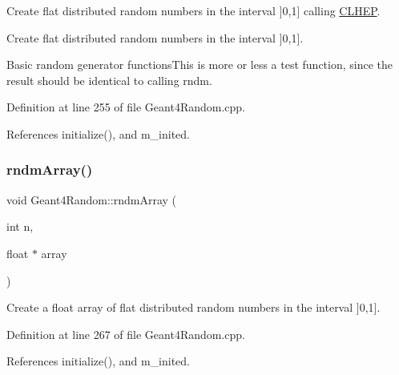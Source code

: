 Create flat distributed random numbers in the interval \mbox{]}0,1\mbox{]} calling \hyperlink{namespace_c_l_h_e_p}{C\+L\+H\+EP}. 

Create flat distributed random numbers in the interval \mbox{]}0,1\mbox{]}.

Basic random generator functions\+This is more or less a test function, since the result should be identical to calling rndm. 

Definition at line 255 of file Geant4\+Random.\+cpp.



References initialize(), and m\+\_\+inited.

\hypertarget{class_d_d4hep_1_1_simulation_1_1_geant4_random_aaf9f4a7acf4d65ce0b3f6b19486d473d}{}\label{class_d_d4hep_1_1_simulation_1_1_geant4_random_aaf9f4a7acf4d65ce0b3f6b19486d473d} 
\subsubsection{\texorpdfstring{rndm\+Array()}{rndmArray()}\hspace{0.1cm}{\footnotesize\ttfamily [1/2]}}
{\footnotesize\ttfamily void Geant4\+Random\+::rndm\+Array (\begin{DoxyParamCaption}\item[{int}]{n,  }\item[{float $\ast$}]{array }\end{DoxyParamCaption})}



Create a float array of flat distributed random numbers in the interval \mbox{]}0,1\mbox{]}. 



Definition at line 267 of file Geant4\+Random.\+cpp.



References initialize(), and m\+\_\+inited.

\hypertarget{class_d_d4hep_1_1_simulation_1_1_geant4_random_a45700086c1a78f0982bd5539e9263895}{}\label{class_d_d4hep_1_1_simulation_1_1_geant4_random_a45700086c1a78f0982bd5539e9263895} 
